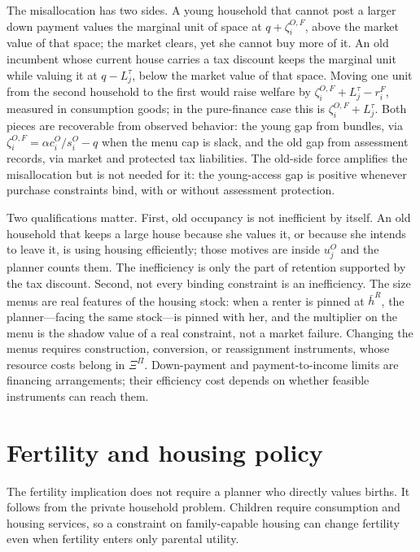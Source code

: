 \documentclass[11pt]{article}
\newcommand{\1}{\mathbf 1}
\begin{document}
The misallocation has two sides. A young household that cannot post a larger down payment values the marginal unit of space at $q+\zeta_i^{O,F}$, above the market value of that space; the market clears, yet she cannot buy more of it. An old incumbent whose current house carries a tax discount keeps the marginal unit while valuing it at $q-L_j^\tau$, below the market value of that space. Moving one unit from the second household to the first would raise welfare by $\zeta_i^{O,F}+L_j^\tau-r_i^F$, measured in consumption goods; in the pure-finance case this is $\zeta_i^{O,F}+L_j^\tau$. Both pieces are recoverable from observed behavior: the young gap from bundles, via $\zeta_i^{O,F}=\alpha c_i^O/s_i^O-q$ when the menu cap is slack, and the old gap from assessment records, via market and protected tax liabilities. The old-side force amplifies the misallocation but is not needed for it: the young-access gap is positive whenever purchase constraints bind, with or without assessment protection.

Two qualifications matter. First, old occupancy is not inefficient by itself. An old household that keeps a large house because she values it, or because she intends to leave it, is using housing efficiently; those motives are inside $u_j^O$ and the planner counts them. The inefficiency is only the part of retention supported by the tax discount. Second, not every binding constraint is an inefficiency. The size menus are real features of the housing stock: when a renter is pinned at $\bar h^R$, the planner---facing the same stock---is pinned with her, and the multiplier on the menu is the shadow value of a real constraint, not a market failure. Changing the menus requires construction, conversion, or reassignment instruments, whose resource costs belong in $\Xi^\Pi$. Down-payment and payment-to-income limits are financing arrangements; their efficiency cost depends on whether feasible instruments can reach them.

\section{Fertility and housing policy}
\label{sec:fertility}

The fertility implication does not require a planner who directly values births. It follows from the private household problem. Children require consumption and housing services, so a constraint on family-capable housing can change fertility even when fertility enters only parental utility.
\end{document}
